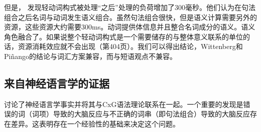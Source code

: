 \begin{exe}
\begin{xlist}[iv.]
\begin{exe}
\begin{xlist}[iv.]
但是， \citet{WP2011a}发现轻动词构式被处理“之后”处理的负荷增加了300毫秒。他们认为在句法组合之后名词与动词发生语义组合。虽然句法组合很快，但是语义计算需要另外的资源，这些资源大约需要300ms。动词提供体信息并且整合名词成分的语义。语义角色融合了。如果说整个轻动词构式是一个需要储存的与整体意义联系的单位的话，资源消耗效应就不会出现（第404页）。我们可以得出结论，Wittenberg和Piñango的结论与词汇方案兼容，而与短语观点不兼容。

\subsection{来自神经语言学的证据}
\label{sec-neuro-linguistics}

\mbox{} \citet*{PCShandbookCxG}讨论了神经语言学事实并将其与CxG语法理论联系在一起。一个重要的发现是错误的词（词项）导致的大脑反应与不正确的词串（即句法组合）导致的大脑反应存在差异。这表明存在一个经验性的基础来决定这个问题。


\end{xlist}
\end{exe}
\end{xlist}
\end{exe}
